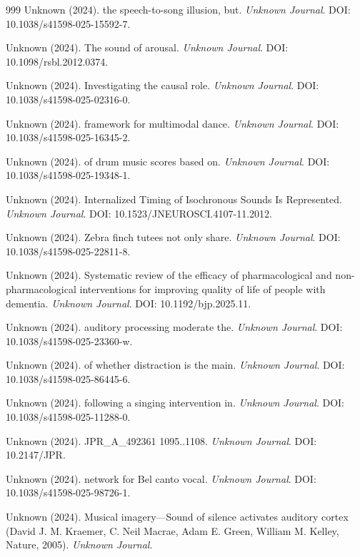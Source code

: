 \documentclass[9pt,onecolumn]{article}
\begin{document}
\begin{thebibliography}{999}
Unknown (2024). the speech-to-song illusion, but. \textit{Unknown Journal}. DOI: 10.1038/s41598-025-15592-7.

Unknown (2024). The sound of arousal. \textit{Unknown Journal}. DOI: 10.1098/rsbl.2012.0374.

Unknown (2024). Investigating the causal role. \textit{Unknown Journal}. DOI: 10.1038/s41598-025-02316-0.

Unknown (2024). framework for multimodal dance. \textit{Unknown Journal}. DOI: 10.1038/s41598-025-16345-2.

Unknown (2024). of drum music scores based on. \textit{Unknown Journal}. DOI: 10.1038/s41598-025-19348-1.

Unknown (2024). Internalized Timing of Isochronous Sounds Is Represented. \textit{Unknown Journal}. DOI: 10.1523/JNEUROSCI.4107-11.2012.

Unknown (2024). Zebra finch tutees not only share. \textit{Unknown Journal}. DOI: 10.1038/s41598-025-22811-8.

Unknown (2024). Systematic review of the efficacy of pharmacological and non-pharmacological interventions for improving quality of life of people with dementia. \textit{Unknown Journal}. DOI: 10.1192/bjp.2025.11.

Unknown (2024). auditory processing moderate the. \textit{Unknown Journal}. DOI: 10.1038/s41598-025-23360-w.

Unknown (2024). of whether distraction is the main. \textit{Unknown Journal}. DOI: 10.1038/s41598-025-86445-6.

Unknown (2024). following a singing intervention in. \textit{Unknown Journal}. DOI: 10.1038/s41598-025-11288-0.

Unknown (2024). JPR\_A\_492361 1095..1108. \textit{Unknown Journal}. DOI: 10.2147/JPR.

Unknown (2024). network for Bel canto vocal. \textit{Unknown Journal}. DOI: 10.1038/s41598-025-98726-1.

Unknown (2024). Musical imagery—Sound of silence activates auditory cortex (David J. M. Kraemer, C. Neil Macrae, Adam E. Green, William M. Kelley, Nature, 2005). \textit{Unknown Journal}.


\end{thebibliography}
\end{document}
